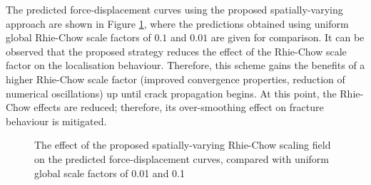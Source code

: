 \documentclass[sn-mathphys,Numbered]{sn-jnl}%
\begin{document}
The predicted force-displacement curves using the proposed spatially-varying approach are shown in Figure \ref{fig:RC_proposed}, where the predictions obtained using uniform global Rhie-Chow scale factors of $0.1$ and $0.01$ are given for comparison.
It can be observed that the proposed strategy reduces the effect of the Rhie-Chow scale factor on the localisation behaviour.
Therefore, this scheme gains the benefits of a higher Rhie-Chow scale factor (improved convergence properties, reduction of numerical oscillations) up until crack propagation begins.
At this point, the Rhie-Chow effects are reduced; therefore, its over-smoothing effect on fracture behaviour is mitigated.
\begin{figure}[htb]
	\centering
	\caption{The effect of the proposed spatially-varying Rhie-Chow scaling field on the predicted force-displacement curves, compared with uniform global scale factors of 0.01 and 0.1}
	\label{fig:RC_proposed}
\end{figure}
\end{document}
